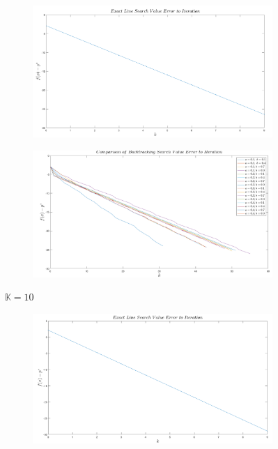 \documentclass[12pt]{article}
\begin{document}
\begin{enumerate}
\begin{enumerate}
\begin{figure}
\begin{subfigure}[b]{0.45\textwidth}
					\includegraphics[width=\textwidth]{3_4.png}
				\end{subfigure}
				\hfill
				\begin{subfigure}[b]{0.45\textwidth}
					\centering
					\includegraphics[width=\textwidth]{3_1.png}
				\end{subfigure}
				\caption{$\mathbb{K}=10$}
			\end{figure}
			\begin{figure}
				\centering
				\begin{subfigure}[b]{0.45\textwidth}
					\centering
					\includegraphics[width=\textwidth]{4_4.png}

\end{subfigure}
\end{figure}
\end{enumerate}
\end{enumerate}
\end{document}
